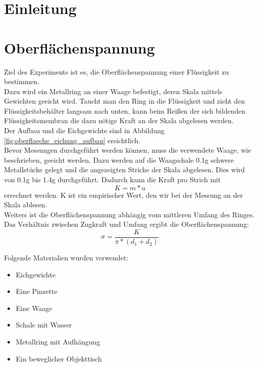 \documentclass[12pt,a4paper]{article}
\begin{document}
\pagebreak
\setlength{\columnsep}{20pt}
\begin{multicols}{2}
\section{Einleitung}

\section{Oberflächenspannung}
Ziel des Experiments ist es, die Oberflächenspannung einer Flüssigkeit zu bestimmen. \\
Dazu wird ein Metallring an einer Waage befestigt, deren Skala mittels Gewichten geeicht wird. Taucht man den Ring in die Flüssigkeit und zieht den Flüssigkeitsbehälter langsam nach unten, kann beim Reißen der sich bildenden Flüssigkeitsmembran die dazu nötige Kraft an der Skala abgelesen werden.\\
Der Aufbau und die Eichgewichte sind in Abbildung \ref{fig:oberflaeche_eichung_aufbau} ersichtlich.\\




\noindent
Bevor Messungen durchgeführt werden können, muss die verwendete Waage, wie beschrieben, geeicht werden. Dazu werden auf die Waagschale 0.1g schwere Metallstücke gelegt und die angezeigten Striche der Skala abgelesen. Dies wird von 0.1g bis 1.4g durchgeführt. Dadurch kann die Kraft pro Strich mit
$$K = m * a$$
errechnet werden. K ist ein empirischer Wert, den wir bei der Messung an der Skala ablesen.\\
Weiters ist die Oberflächenspannung abhängig vom mittleren Umfang des Ringes. Das Verhältnis zwischen Zugkraft und Umfang ergibt die Oberflächenspannung:
$$\sigma = \frac{K}{\pi * (d_1 + d_2)}$$

\noindent
Folgende Materialien wurden verwendet:
\begin{itemize}
	\item Eichgewichte
	\item Eine Pinzette
	\item Eine Waage
	\item Schale mit Wasser
	\item Metallring mit Aufhängung
	\item Ein beweglicher Objekttisch
\end{itemize}


\end{multicols}
\end{document}
